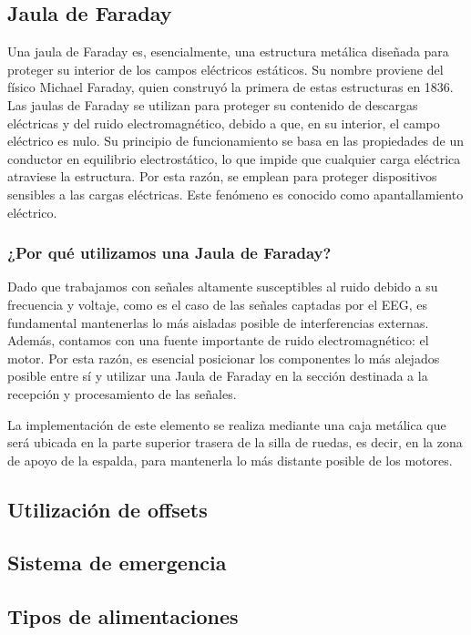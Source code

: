 \documentclass{article}
\begin{document}
\subsection{Jaula de Faraday}
Una jaula de Faraday es, esencialmente, una estructura metálica diseñada para proteger su interior de los campos eléctricos estáticos. Su nombre proviene del físico Michael Faraday, quien construyó la primera de estas estructuras en 1836. Las jaulas de Faraday se utilizan para proteger su contenido de descargas eléctricas y del ruido electromagnético, debido a que, en su interior, el campo eléctrico es nulo. Su principio de funcionamiento se basa en las propiedades de un conductor en equilibrio electrostático, lo que impide que cualquier carga eléctrica atraviese la estructura. Por esta razón, se emplean para proteger dispositivos sensibles a las cargas eléctricas. Este fenómeno es conocido como apantallamiento eléctrico.

\subsubsection{¿Por qué utilizamos una Jaula de Faraday?}
Dado que trabajamos con señales altamente susceptibles al ruido debido a su frecuencia y voltaje, como es el caso de las señales captadas por el EEG, es fundamental mantenerlas lo más aisladas posible de interferencias externas. Además, contamos con una fuente importante de ruido electromagnético: el motor. Por esta razón, es esencial posicionar los componentes lo más alejados posible entre sí y utilizar una Jaula de Faraday en la sección destinada a la recepción y procesamiento de las señales.

La implementación de este elemento se realiza mediante una caja metálica que será ubicada en la parte superior trasera de la silla de ruedas, es decir, en la zona de apoyo de la espalda, para mantenerla lo más distante posible de los motores.

\subsection{Utilización de offsets}

\subsection{Sistema de emergencia}

\subsection{Tipos de alimentaciones}
\end{document}
